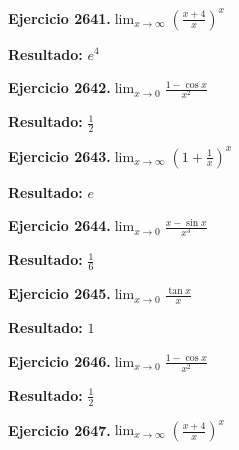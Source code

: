 \documentclass[10pt,a4paper]{article}
\begin{document}
\begin{ejbox}
\textbf{Ejercicio 2641.}\quad $\lim_{x\to \infty} \left(\frac{x+4}{x}\right)^{x}$
\end{ejbox}

\begin{solbox}
\textbf{Resultado:} \(\displaystyle e^{4}\)
\end{solbox}

\begin{ejbox}
\textbf{Ejercicio 2642.}\quad $\lim_{x\to 0} \frac{1-\cos x}{x^2}$
\end{ejbox}

\begin{solbox}
\textbf{Resultado:} \(\displaystyle \frac{1}{2}\)
\end{solbox}

\newpage
\begin{ejbox}
\textbf{Ejercicio 2643.}\quad $\lim_{x\to \infty} \left(1+\frac{1}{x}\right)^x$
\end{ejbox}

\begin{solbox}
\textbf{Resultado:} \(\displaystyle e\)
\end{solbox}

\begin{ejbox}
\textbf{Ejercicio 2644.}\quad $\lim_{x\to 0} \frac{x-\sin x}{x^3}$
\end{ejbox}

\begin{solbox}
\textbf{Resultado:} \(\displaystyle \frac{1}{6}\)
\end{solbox}

\begin{ejbox}
\textbf{Ejercicio 2645.}\quad $\lim_{x\to 0} \frac{\tan x}{x}$
\end{ejbox}

\begin{solbox}
\textbf{Resultado:} \(\displaystyle 1\)
\end{solbox}

\newpage
\begin{ejbox}
\textbf{Ejercicio 2646.}\quad $\lim_{x\to 0} \frac{1-\cos x}{x^2}$
\end{ejbox}

\begin{solbox}
\textbf{Resultado:} \(\displaystyle \frac{1}{2}\)
\end{solbox}

\begin{ejbox}
\textbf{Ejercicio 2647.}\quad $\lim_{x\to \infty} \left(\frac{x+4}{x}\right)^{x}$
\end{ejbox}
\end{document}
